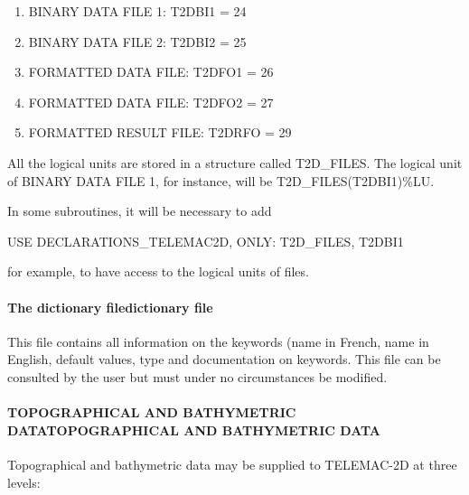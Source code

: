 \documentclass{article} %
\begin{document}
\begin{enumerate}
\item  BINARY DATA FILE 1: T2DBI1 = 24

\item  BINARY DATA FILE 2: T2DBI2 = 25

\item  FORMATTED DATA FILE: T2DFO1 = 26

\item  FORMATTED DATA FILE: T2DFO2 = 27

\item  FORMATTED RESULT FILE: T2DRFO = 29
\end{enumerate}

 All the logical units are stored in a structure called T2D\_FILES. The logical unit of BINARY DATA FILE 1, for instance, will be T2D\_FILES(T2DBI1)\%LU.


 In some subroutines, it will be necessary to add

  USE DECLARATIONS\_TELEMAC2D, ONLY: T2D\_FILES, T2DBI1

 for example, to have access to the logical units of files.


\paragraph{ The dictionary filedictionary file}

 This file contains all information on the keywords (name in French, name in English, default values, type and documentation on keywords. This file can be consulted by the user but must under no circumstances be modified.


\paragraph{ TOPOGRAPHICAL AND BATHYMETRIC DATATOPOGRAPHICAL AND BATHYMETRIC DATA}

 Topographical and bathymetric data may be supplied to TELEMAC-2D at three levels:
\end{document}
